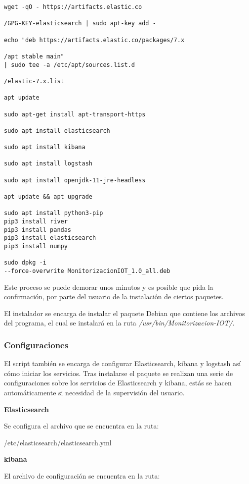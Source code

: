 \begin{lstlisting}[frame=single] 
wget -qO - https://artifacts.elastic.co

/GPG-KEY-elasticsearch | sudo apt-key add -

echo "deb https://artifacts.elastic.co/packages/7.x

/apt stable main" 
| sudo tee -a /etc/apt/sources.list.d

/elastic-7.x.list

apt update

sudo apt-get install apt-transport-https

sudo apt install elasticsearch

sudo apt install kibana

sudo apt install logstash

sudo apt install openjdk-11-jre-headless

apt update && apt upgrade

sudo apt install python3-pip
pip3 install river
pip3 install pandas
pip3 install elasticsearch
pip3 install numpy

sudo dpkg -i 
--force-overwrite MonitorizacionIOT_1.0_all.deb

\end{lstlisting}

Este proceso se puede demorar unos minutos y es posible que pida la confirmación, por parte del usuario de la instalación de ciertos paquetes.

El instalador se encarga de instalar el paquete Debian que contiene los archivos del programa, el cual se instalará en la ruta \textit{/usr/bin/Monitorizacion-IOT/}. 

\subsubsection{Configuraciones}

El script también se encarga de configurar Elasticsearch, kibana y logstash así cómo iniciar los servicios.
Tras instalarse el paquete se realizan una serie de configuraciones sobre los servicios de Elasticsearch y kibana, estás se hacen automáticamente si necesidad de la supervisión del usuario.

\textbf{Elasticsearch}

Se configura el archivo que se encuentra en la ruta:

/etc/elasticsearch/elasticsearch.yml

\textbf{kibana}

El archivo de configuración se encuentra en la ruta:

